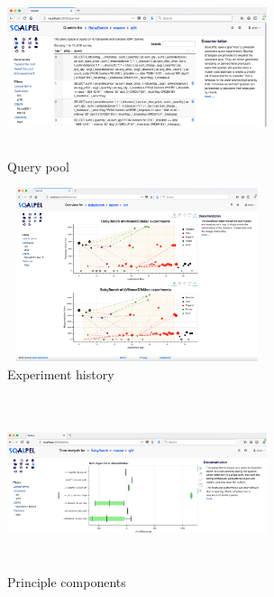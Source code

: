 \documentclass{cidr-2019}
\begin{document}

\begin{figure}[t!]
\centering
\includegraphics[height=2in,width=3in]{Figures/querypool2.png}
\caption{Query pool
	\label{fig:querypool2}}
\end{figure}

\begin{figure}[t!]
\centering
\includegraphics[height=2in,width=3in]{Figures/history2.png}
\caption{Experiment history
	\label{fig:history}}
\end{figure}

\begin{figure}[t!]
\centering
\includegraphics[height=2in,width=3in]{Figures/components2.png}
\caption{Principle components
	\label{fig:components}}
\end{figure}
\end{document}
